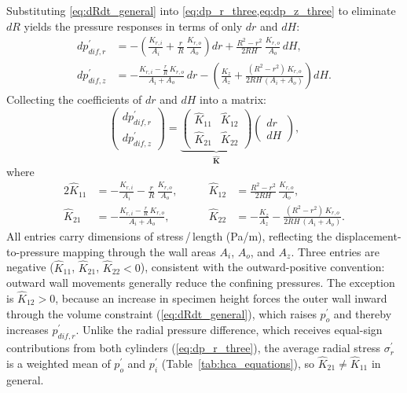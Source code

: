 Substituting \cref{eq:dRdt_general} into \cref{eq:dp_r_three,eq:dp_z_three} to eliminate $dR$ yields the pressure responses in terms of only $dr$ and $dH$:
\begin{align}
dp_{dif,r}^{\prime}
  &= -\!\left(\frac{K_{r,i}}{A_i}+\frac{r}{R}\,\frac{K_{r,o}}{A_o}\right)dr
     +\frac{R^2-r^2}{2RH}\,\frac{K_{r,o}}{A_o}\,dH, \label{eq:dp_r_two}\\[6pt]
dp_{dif,z}^{\prime}
  &= -\frac{K_{r,i}-\frac{r}{R}\,K_{r,o}}{A_i+A_o}\,dr
     -\!\left(\frac{K_z}{A_z}+\frac{(R^2-r^2)\,K_{r,o}}{2RH\,(A_i+A_o)}\right)dH. \label{eq:dp_z_two}
\end{align}
Collecting the coefficients of $dr$ and $dH$ into a matrix:
\begin{equation}
\begin{pmatrix} dp_{dif,r}^{\prime} \\[4pt] dp_{dif,z}^{\prime} \end{pmatrix}
=
\underbrace{\begin{pmatrix} \hat{K}_{11} & \hat{K}_{12} \\[8pt] \hat{K}_{21} & \hat{K}_{22} \end{pmatrix}}_{\hat{\mathbf{K}}}
\begin{pmatrix} dr \\[4pt] dH \end{pmatrix},
\label{eq:stiffness_matrix}
\end{equation}
where
\begin{alignat}{2}
\hat{K}_{11} &= -\frac{K_{r,i}}{A_i}-\frac{r}{R}\,\frac{K_{r,o}}{A_o}, &\qquad
\hat{K}_{12} &= \frac{R^2-r^2}{2RH}\,\frac{K_{r,o}}{A_o}, \label{eq:Khat_row1}\\[4pt]
\hat{K}_{21} &= -\frac{K_{r,i}-\frac{r}{R}\,K_{r,o}}{A_i+A_o}, &\qquad
\hat{K}_{22} &= -\frac{K_z}{A_z}-\frac{(R^2-r^2)\,K_{r,o}}{2RH\,(A_i+A_o)}. \label{eq:Khat_row2}
\end{alignat}
All entries carry dimensions of stress\,/\,length (Pa/m), reflecting the displacement-to-pressure mapping through the wall areas $A_i$, $A_o$, and $A_z$. Three entries are negative ($\hat{K}_{11}$, $\hat{K}_{21}$, $\hat{K}_{22}<0$), consistent with the outward-positive convention: outward wall movements generally reduce the confining pressures. The exception is $\hat{K}_{12}>0$, because an increase in specimen height forces the outer wall inward through the volume constraint (\cref{eq:dRdt_general}), which raises $p_o^{\prime}$ and thereby increases $p_{dif,r}^{\prime}$. Unlike the radial pressure difference, which receives equal-sign contributions from both cylinders (\cref{eq:dp_r_three}), the average radial stress $\sigma_r^{\prime}$ is a weighted mean of $p_o^{\prime}$ and $p_i^{\prime}$ (Table~\ref{tab:hca_equations}), so $\hat{K}_{21}\neq\hat{K}_{11}$ in general.

